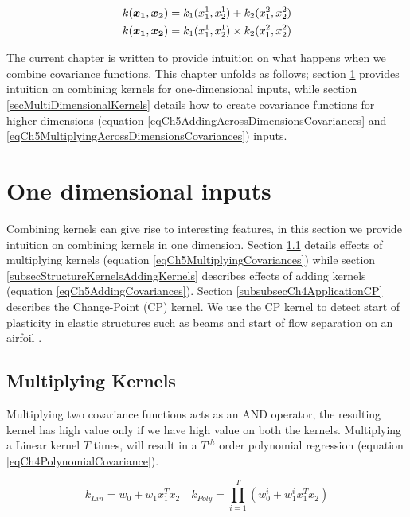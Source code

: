 \begin{align}
k(\boldsymbol{x_{1}}, \boldsymbol{x_{2}}) = k_{1}(x_{1}^{1}, x_{2}^{1}) + k_{2}(x_{1}^{2}, x_{2}^{2}) \label{eqCh5AddingAcrossDimensionsCovariances} \\
k(\boldsymbol{x_{1}}, \boldsymbol{x_{2}}) = k_{1}(x_{1}^{1}, x_{2}^{1}) \times k_{2}(x_{1}^{2}, x_{2}^{2}) \label{eqCh5MultiplyingAcrossDimensionsCovariances} 
\end{align}

The current chapter is written to provide intuition on what happens when we combine covariance functions. This chapter unfolds as follows; section \ref{secSingleDimension} provides intuition on combining kernels for one-dimensional inputs, while section \ref{secMultiDimensionalKernels} details how to create covariance functions for higher-dimensions (equation \ref{eqCh5AddingAcrossDimensionsCovariances} and \ref{eqCh5MultiplyingAcrossDimensionsCovariances}) inputs. 

\section{One dimensional inputs}\label{secSingleDimension}
Combining kernels can give rise to interesting features, in this section we provide intuition on combining kernels in one dimension. Section \ref{subsecStructureKernelsMultiplyingKernels} details effects of multiplying kernels (equation \ref{eqCh5MultiplyingCovariances}) while section \ref{subsecStructureKernelsAddingKernels} describes effects of adding kernels (equation \ref{eqCh5AddingCovariances}). Section \ref{subsubsecCh4ApplicationCP} describes the Change-Point (CP) kernel. We use the CP kernel to detect start of plasticity in elastic structures such as beams and start of flow separation on an airfoil \cite{chiplunkar:hal-01555401}. 


\subsection{Multiplying Kernels} \label{subsecStructureKernelsMultiplyingKernels}
Multiplying two covariance functions acts as an AND operator, the resulting kernel has high value only if we have high value on both the kernels. Multiplying a Linear kernel $T$ times, will result in a $T^{th}$ order polynomial regression (equation \ref{eqCh4PolynomialCovariance}). 

\begin{equation}\label{eqCh4PolynomialCovariance}
k_{Lin} = w_{0} + w_{1}x_{1}^T x_{2} \quad k_{Poly} = \prod_{i=1}^{T} \left (w_{0}^{i} + w_{1}^{i}x_{1}^T x_{2} \right)
\end{equation}

